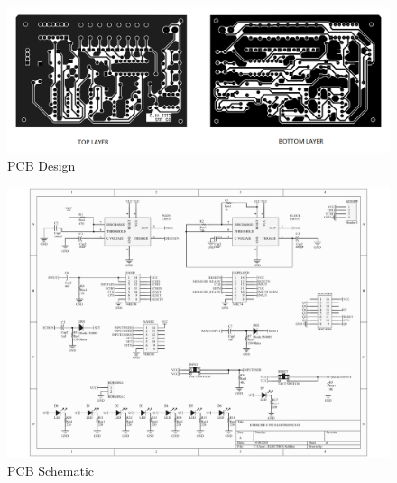 \begin{figure}[h!]
\begin{centering}
\includegraphics[scale=0.5]{../Exercise8/Informe/images/PCB_Layers}
\par\end{centering}
\caption{\color{cyan}PCB Design}
\label{8_9}
\end{figure}

\begin{figure}[h!]
\begin{centering}
\includegraphics[scale=0.6]{../Exercise8/Informe/Schematic}
\par\end{centering}
\caption{\color{cyan}PCB Schematic}

\end{figure}

